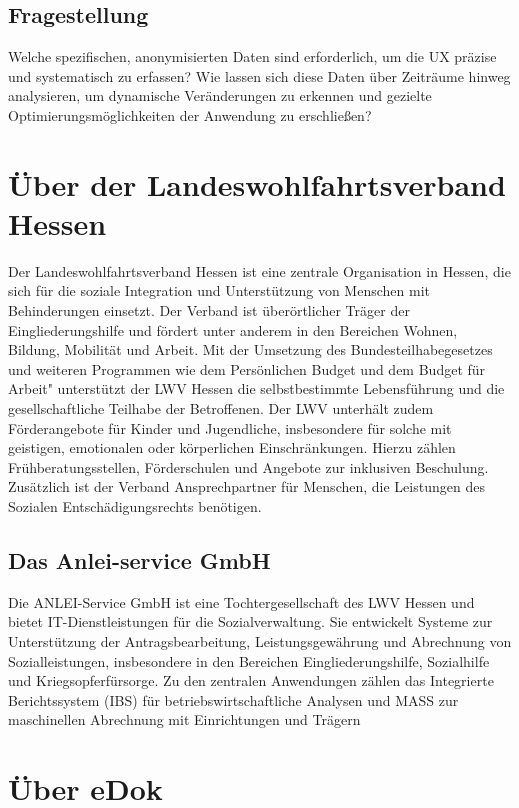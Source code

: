 \documentclass[12pt,oneside]{article}
\begin{document}
\subsection{Fragestellung}
Welche spezifischen, anonymisierten Daten sind erforderlich, um die UX präzise und systematisch zu erfassen? Wie lassen sich diese Daten über Zeiträume hinweg analysieren, um dynamische Veränderungen zu erkennen und gezielte Optimierungsmöglichkeiten der Anwendung zu erschließen?

\section{Über der Landeswohlfahrtsverband Hessen}
Der Landeswohlfahrtsverband Hessen ist eine zentrale Organisation in Hessen, die sich für die soziale Integration und Unterstützung von Menschen mit Behinderungen einsetzt. Der Verband ist überörtlicher Träger der Eingliederungshilfe und fördert unter anderem in den Bereichen Wohnen, Bildung, Mobilität und Arbeit. Mit der Umsetzung des Bundesteilhabegesetzes und weiteren Programmen wie dem Persönlichen Budget  und dem Budget für Arbeit" unterstützt der LWV Hessen die selbstbestimmte Lebensführung und die gesellschaftliche Teilhabe der Betroffenen. Der LWV unterhält zudem Förderangebote für Kinder und Jugendliche, insbesondere für solche mit geistigen, emotionalen oder körperlichen Einschränkungen. Hierzu zählen Frühberatungsstellen, Förderschulen und Angebote zur inklusiven Beschulung. Zusätzlich ist der Verband Ansprechpartner für Menschen, die Leistungen des Sozialen Entschädigungsrechts benötigen.\subsection{Das Anlei-service GmbH}
Die ANLEI-Service GmbH ist eine Tochtergesellschaft des LWV Hessen  und bietet IT-Dienstleistungen für die Sozialverwaltung. Sie entwickelt Systeme zur Unterstützung der Antragsbearbeitung, Leistungsgewährung und Abrechnung von Sozialleistungen, insbesondere in den Bereichen Eingliederungshilfe, Sozialhilfe und Kriegsopferfürsorge. Zu den zentralen Anwendungen zählen das Integrierte Berichtssystem (IBS) für betriebswirtschaftliche Analysen und MASS zur maschinellen Abrechnung mit Einrichtungen und Trägern

\section{Über eDok}
   
\end{document}
